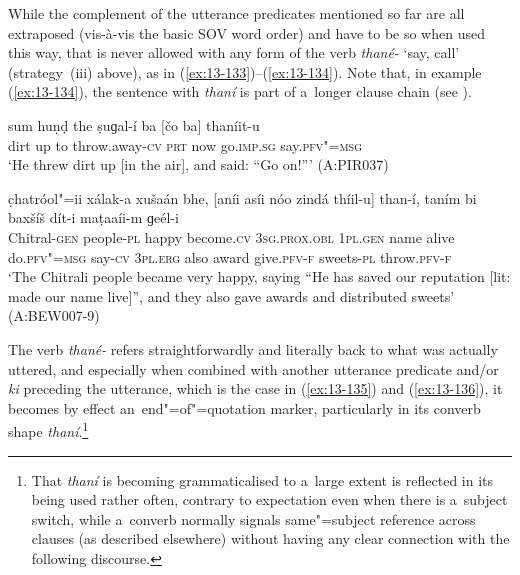 While the complement of the utterance predicates mentioned so far are all extraposed (vis-à-vis the basic SOV word order) and have to be so when used this way, that is never allowed with any form of the verb \textit{thané-} `say, call' (strategy~(iii) above), as in (\ref{ex:13-133})--(\ref{ex:13-134}). Note that, in example (\ref{ex:13-134}), the sentence with \textit{thaní} is part of a~longer clause chain (see ).

\begin{exe}
\ex
\label{ex:13-133}
\gll sum huṇḍ the ṣuɡal-í ba [čo ba]  thaníit-u \\
dirt up to throw.away-\textsc{cv} \textsc{prt} now go.\textsc{imp.sg} say.\textsc{pfv"=msg} \\
\glt `He threw dirt up [in the air], and said: ``Go on!''' (A:PIR037)

\ex
\label{ex:13-134}
\gll c̣hatróol"=ii xálak-a xušaán bhe,  [aníi asíi nóo zindá thíil-u]
than-í,  taním bi baxšíš dít-i maṭaaíi-m   ɡeél-i \\
Chitral-\textsc{gen} people-\textsc{pl} happy become.\textsc{cv}  \textsc{3sg.prox.obl } \textsc{1pl.gen} name alive do.\textsc{pfv"=msg} say-\textsc{cv}  \textsc{3pl.erg} also award give.\textsc{pfv-f} sweets-\textsc{pl} throw.\textsc{pfv-f}  \\
\glt `The Chitrali people became very happy, saying ``He has saved our reputation [lit: made our name live]'', and they also gave awards and distributed sweets' (A:BEW007-9) 
\end{exe}

The verb \textit{thané-} refers straightforwardly and literally back to what was actually uttered,
and especially when combined with another utterance predicate and/or \textit{ki} preceding the
utterance, which is the case in (\ref{ex:13-135}) and (\ref{ex:13-136}), it becomes by effect
an~end"=of"=quotation marker, particularly in its converb shape \textit{thaní}.\footnote{That
  \textit{thaní} is becoming grammaticalised to a~large extent is reflected in its being used rather
  often, contrary to expectation even when there is a~subject switch, while a~converb normally
  signals same"=subject reference across clauses (as described elsewhere) without having any clear
  connection with the following discourse.}


